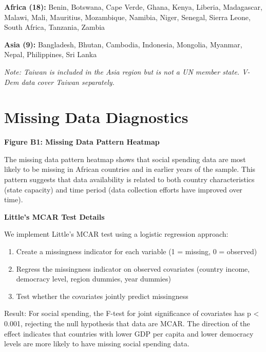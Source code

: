 \documentclass[11pt,letterpaper]{article}
\begin{document}
\textbf{Africa (18):} Benin, Botswana, Cape Verde, Ghana, Kenya, Liberia, Madagascar, Malawi, Mali, Mauritius, Mozambique, Namibia, Niger, Senegal, Sierra Leone, South Africa, Tanzania, Zambia

\textbf{Asia (9):} Bangladesh, Bhutan, Cambodia, Indonesia, Mongolia, Myanmar, Nepal, Philippines, Sri Lanka

\textit{Note: Taiwan is included in the Asia region but is not a UN member state. V-Dem data cover Taiwan separately.}

\section{Missing Data Diagnostics}

\textbf{Figure B1: Missing Data Pattern Heatmap}

The missing data pattern heatmap shows that social spending data are most likely to be missing in African countries and in earlier years of the sample. This pattern suggests that data availability is related to both country characteristics (state capacity) and time period (data collection efforts have improved over time).

\textbf{Little's MCAR Test Details}

We implement Little's MCAR test using a logistic regression approach:

\begin{enumerate}
  \item Create a missingness indicator for each variable (1 = missing, 0 = observed)
  \item Regress the missingness indicator on observed covariates (country income, democracy level, region dummies, year dummies)
  \item Test whether the covariates jointly predict missingness
\end{enumerate}

Result: For social spending, the F-test for joint significance of covariates has p < 0.001, rejecting the null hypothesis that data are MCAR. The direction of the effect indicates that countries with lower GDP per capita and lower democracy levels are more likely to have missing social spending data.

\newpage



\end{document}
